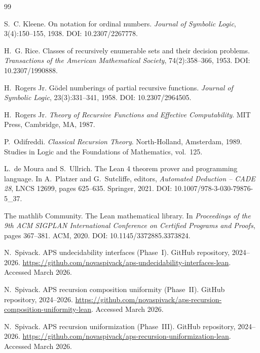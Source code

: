 \documentclass[11pt]{article}
\begin{document}
\begin{thebibliography}{99}

S.~C. Kleene.
\newblock On notation for ordinal numbers.
\newblock \emph{Journal of Symbolic Logic}, 3(4):150--155, 1938.
\newblock DOI: 10.2307/2267778.

H.~G. Rice.
\newblock Classes of recursively enumerable sets and their decision problems.
\newblock \emph{Transactions of the American Mathematical Society}, 74(2):358--366, 1953.
\newblock DOI: 10.2307/1990888.

H.~Rogers Jr.
\newblock G\"odel numberings of partial recursive functions.
\newblock \emph{Journal of Symbolic Logic}, 23(3):331--341, 1958.
\newblock DOI: 10.2307/2964505.

H.~Rogers Jr.
\newblock \emph{Theory of Recursive Functions and Effective Computability}.
\newblock MIT Press, Cambridge, MA, 1987.

P.~Odifreddi.
\newblock \emph{Classical Recursion Theory}.
\newblock North-Holland, Amsterdam, 1989.
\newblock Studies in Logic and the Foundations of Mathematics, vol.~125.

L.~de Moura and S.~Ullrich.
\newblock The Lean 4 theorem prover and programming language.
\newblock In A.~Platzer and G.~Sutcliffe, editors, \emph{Automated Deduction -- CADE 28}, LNCS 12699, pages 625--635. Springer, 2021.
\newblock DOI: 10.1007/978-3-030-79876-5\_37.

The mathlib Community.
\newblock The Lean mathematical library.
\newblock In \emph{Proceedings of the 9th ACM SIGPLAN International Conference on Certified Programs and Proofs}, pages 367--381. ACM, 2020.
\newblock DOI: 10.1145/3372885.3373824.

N.~Spivack.
\newblock APS undecidability interfaces (Phase~I).
\newblock GitHub repository, 2024--2026.
\newblock \url{https://github.com/novaspivack/aps-undecidability-interfaces-lean}.
\newblock Accessed March 2026.

N.~Spivack.
\newblock APS recursion composition uniformity (Phase~II).
\newblock GitHub repository, 2024--2026.
\newblock \url{https://github.com/novaspivack/aps-recursion-composition-uniformity-lean}.
\newblock Accessed March 2026.

N.~Spivack.
\newblock APS recursion uniformization (Phase~III).
\newblock GitHub repository, 2024--2026.
\newblock \url{https://github.com/novaspivack/aps-recursion-uniformization-lean}.
\newblock Accessed March 2026.

\end{thebibliography}
\end{document}
